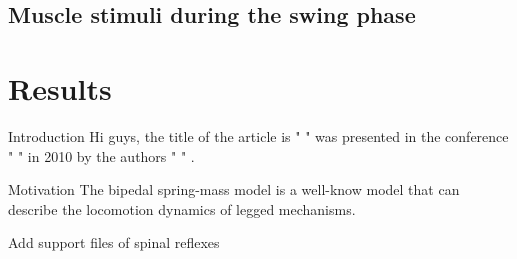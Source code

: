 \documentclass[10pt]{beamer}
\begin{document}
\subsection[Methodology]{Muscle stimuli during the swing phase}


\section{Results}


\begin{frame}
	\begin{exampleblock}{Introduction}
		Hi guys, the title of the article is "  " was presented in the conference " " in 2010 by the authors "  " .
	\end{exampleblock}
	\begin{exampleblock}{Motivation}
		The bipedal spring-mass model is a well-know model that can describe the locomotion  dynamics of legged mechanisms.
	\end{exampleblock}
	\begin{exampleblock}
		Add support files of spinal reflexes
	\end{exampleblock}
\end{frame}
\end{document}
